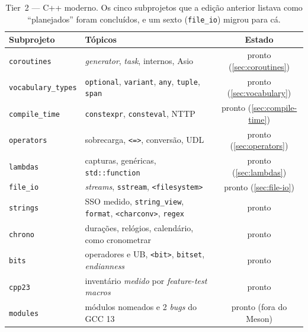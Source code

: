 \begin{table}[htbp]
\centering
\caption{Tier~2 --- C++ moderno. Os cinco subprojetos que a edição anterior
         listava como ``planejados'' foram concluídos, e um sexto
         (\texttt{file\_io}) migrou para cá.}
\label{tab:tier2}
\footnotesize
\begin{tabular}{@{}llc@{}}
\toprule
\textbf{Subprojeto} & \textbf{Tópicos} & \textbf{Estado} \\
\midrule
\texttt{coroutines}        & \emph{generator}, \emph{task}, internos, Asio & pronto (\ref{sec:coroutines}) \\
\texttt{vocabulary\_types} & \texttt{optional}, \texttt{variant}, \texttt{any}, \texttt{tuple}, \texttt{span} & pronto (\ref{sec:vocabulary}) \\
\texttt{compile\_time}     & \texttt{constexpr}, \texttt{consteval}, NTTP & pronto (\ref{sec:compile-time}) \\
\texttt{operators}         & sobrecarga, \texttt{<=>}, conversão, UDL & pronto (\ref{sec:operators}) \\
\texttt{lambdas}           & capturas, genéricas, \texttt{std::function} & pronto (\ref{sec:lambdas}) \\
\texttt{file\_io}          & \emph{streams}, \texttt{sstream}, \texttt{<filesystem>} & pronto (\ref{sec:file-io}) \\
\texttt{strings}           & SSO medido, \texttt{string\_view}, \texttt{format}, \texttt{<charconv>}, \texttt{regex} & pronto \\
\texttt{chrono}            & durações, relógios, calendário, como cronometrar & pronto \\
\texttt{bits}              & operadores e UB, \texttt{<bit>}, \texttt{bitset}, \emph{endianness} & pronto \\
\texttt{cpp23}             & inventário \emph{medido} por \emph{feature-test macros} & pronto \\
\texttt{modules}           & módulos nomeados e 2 \emph{bugs} do GCC 13 & pronto (fora do Meson) \\
\bottomrule
\end{tabular}
\end{table}

